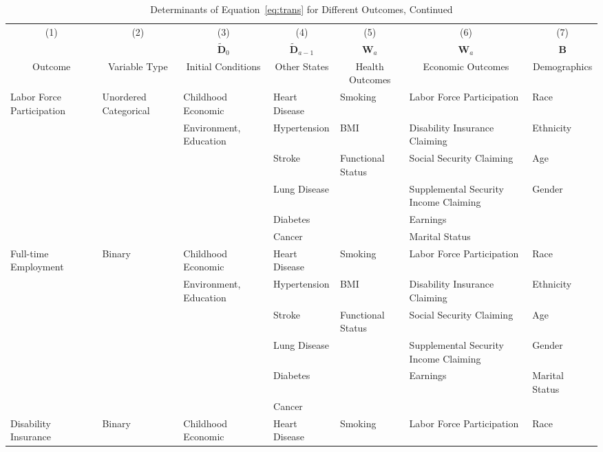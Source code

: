\begin{table}
\caption{Determinants of Equation~\eqref{eq:trans} for Different Outcomes, Continued} \label{table:supertab3}
\begin{scriptsize}
\begin{tabular}{lllllll}
\toprule 
\multicolumn{1}{c}{(1)} & \multicolumn{1}{c}{(2)} & \multicolumn{1}{c}{(3)} & \multicolumn{1}{c}{(4)} & \multicolumn{1}{c}{(5)} & \multicolumn{1}{c}{(6)} & \multicolumn{1}{c}{(7)} \\
 & &  \multicolumn{1}{c}{$\tilde{\bm{D}}_0$} &  \multicolumn{1}{c}{$\tilde{\bm{D}}_{a-1}$} & \multicolumn{1}{c}{ $\bm{W}_a$ } &  \multicolumn{1}{c}{ $\bm{W}_a$ } &  \multicolumn{1}{c}{$\bm{B}$} \\ 
\multicolumn{1}{c}{Outcome} & \multicolumn{1}{c}{Variable Type} & \multicolumn{1}{c}{Initial Conditions} & \multicolumn{1}{c}{Other States} & \multicolumn{1}{c}{Health Outcomes} & \multicolumn{1}{c}{Economic Outcomes} & \multicolumn{1}{c}{Demographics} \\
\midrule
Labor Force Participation & Unordered Categorical & Childhood Economic& Heart Disease & Smoking & Labor Force Participation & Race \\
& & Environment, Education & Hypertension & BMI & Disability Insurance Claiming  & Ethnicity \\
& & & Stroke & Functional Status & Social Security Claiming & Age \\
& & & Lung Disease &   & Supplemental Security Income Claiming & Gender \\
& & & Diabetes &  & Earnings &  \\
& & & Cancer &  & Marital Status & \\
\midrule
Full-time Employment & Binary & Childhood Economic & Heart Disease & Smoking & Labor Force Participation & Race \\
& & Environment, Education & Hypertension & BMI & Disability Insurance Claiming  & Ethnicity \\
& & & Stroke & Functional Status & Social Security Claiming & Age \\
& & & Lung Disease &   & Supplemental Security Income Claiming & Gender \\
& & & Diabetes &  & Earnings & Marital Status \\
& & & Cancer &  &  & \\
\midrule			
Disability Insurance  & Binary & Childhood Economic & Heart Disease & Smoking & Labor Force Participation & Race \\

\end{tabular}
\end{scriptsize}
\end{table}
